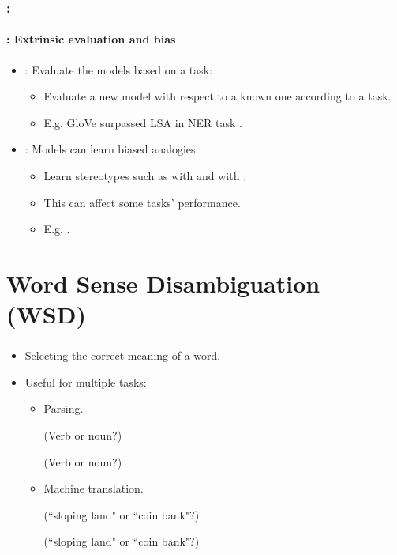 \documentclass[xcolor=table]{beamer}
\begin{document}
\begin{frame}
	\frametitle{\insertshortsubtitle: \insertsection}
	\framesubtitle{\insertsubsection: Extrinsic evaluation and bias}
	
	\begin{itemize}
		\item  {}: Evaluate the models based on a task:
		\begin{itemize}
			\item Evaluate a new model with respect to a known one according to a task.
			\item E.g. GloVe surpassed LSA in NER task \cite{2014-pennington-al}.
		\end{itemize}
		\item {}: Models can learn biased analogies.
		\begin{itemize}
			\item Learn stereotypes such as  with  and  with  \cite{2017-caliskan-al}.
			\item This can affect some tasks' performance. 
			\item E.g. .
		\end{itemize}
	\end{itemize}
	
\end{frame}

\section{Word Sense Disambiguation (WSD)}

\begin{frame}
	\frametitle{\insertshortsubtitle}
	\framesubtitle{\insertsection}

	\begin{itemize}
		\item Selecting the correct meaning of a word.
		\item Useful for multiple tasks:
		\begin{itemize}
			\item Parsing.
			
			 (Verb or noun?)
			
			 (Verb or noun?)
			
			\item Machine translation.
			
			 (``sloping land" or ``coin bank"?)
			
			 (``sloping land" or ``coin bank"?)
		\end{itemize}
	\end{itemize}

\end{frame}
\end{document}
